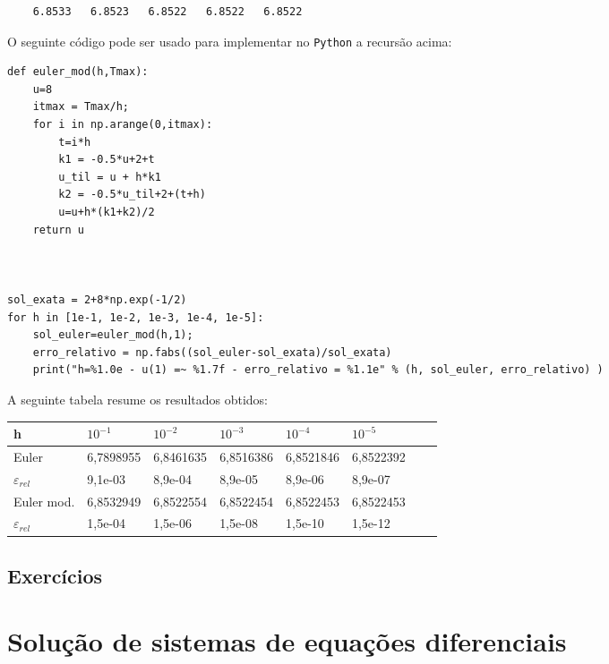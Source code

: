 \begin{resol}
\begin{verbatim}
    6.8533   6.8523   6.8522   6.8522   6.8522
\end{verbatim}
\fi
\ifispython
O seguinte código pode ser usado para implementar no \verb+Python+ a recursão acima:

\begin{verbatim}
def euler_mod(h,Tmax):
	u=8
  	itmax = Tmax/h;
	for i in np.arange(0,itmax):
		t=i*h
		k1 = -0.5*u+2+t
		u_til = u + h*k1
		k2 = -0.5*u_til+2+(t+h)
		u=u+h*(k1+k2)/2
	return u



sol_exata = 2+8*np.exp(-1/2)
for h in [1e-1, 1e-2, 1e-3, 1e-4, 1e-5]:
	sol_euler=euler_mod(h,1);
	erro_relativo = np.fabs((sol_euler-sol_exata)/sol_exata)
	print("h=%1.0e - u(1) =~ %1.7f - erro_relativo = %1.1e" % (h, sol_euler, erro_relativo) )

\end{verbatim}
\fi
A seguinte tabela resume os resultados obtidos:
\begin{center}
 \begin{tabular}{|l|l|l|l|l|l|l|l|}%
\hline
   h&$10^{-1}$&$10^{-2}$&$10^{-3}$&$10^{-4}$&$10^{-5}$\\
   \hline
   Euler & 6,7898955 &  6,8461635  &  6,8516386  &  6,8521846  &  6,8522392  \\
   \hline
   $\varepsilon_{rel}$ &9,1e-03 &  8,9e-04  & 8,9e-05&   8,9e-06 &  8,9e-07\\
   \hline
  Euler mod. & 6,8532949 &  6,8522554  &  6,8522454  &  6,8522453  &  6,8522453 \\
   \hline
   $\varepsilon_{rel}$ &1,5e-04 &  1,5e-06  & 1,5e-08&   1,5e-10 &  1,5e-12\\
   \hline

   \end{tabular}
\end{center}
\end{resol}

\subsection*{Exercícios}

\construirExer

\section{Solução de sistemas de equações diferenciais}\label{sec:solsistema}

